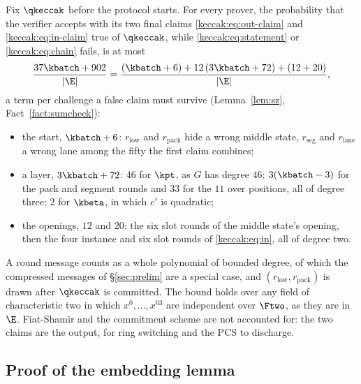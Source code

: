 Fix $\qkeccak$ before the protocol starts. For every prover, the probability that the verifier accepts with its two final claims \eqref{keccak:eq:out-claim} and \eqref{keccak:eq:in-claim} true of $\qkeccak$, while \eqref{keccak:eq:statement} or \eqref{keccak:eq:chain} fails, is at most
\[
\frac{37\kbatch+902}{|\E|}=\frac{(\kbatch+6)+12\,(3\kbatch+72)+(12+20)}{|\E|},
\]
a term per challenge a false claim must survive (Lemma~\ref{lem:sz}, Fact~\ref{fact:sumcheck}):
\begin{itemize}
\item the start, $\kbatch+6$: $r_{\mathrm{low}}$ and $r_{\mathrm{pack}}$ hide a wrong middle state, $r_{\mathrm{seg}}$ and $r_{\mathrm{lane}}$ a wrong lane among the fifty the first claim combines;
\item a layer, $3\kbatch+72$: $46$ for $\kpt$, as $G$ has degree $46$; $3(\kbatch-3)$ for the pack and segment rounds and $33$ for the $11$ over positions, all of degree three; $2$ for $\kbeta$, in which $c'$ is quadratic;
\item the openings, $12$ and $20$: the six slot rounds of the middle state's opening, then the four instance and six slot rounds of \eqref{keccak:eq:in}, all of degree two.
\end{itemize}
A round message counts as a whole polynomial of bounded degree, of which the compressed messages of \S\ref{sec:prelim} are a special case, and $(r_{\mathrm{low}},r_{\mathrm{pack}})$ is drawn after $\qkeccak$ is committed. The bound holds over any field of characteristic two in which $x^0,\dots,x^{63}$ are independent over $\Ftwo$, as they are in $\E$. Fiat-Shamir and the commitment scheme are not accounted for: the two claims are the output, for ring switching and the PCS to discharge.

\subsection{Proof of the embedding lemma}\label{keccak:rmfe-proof}

